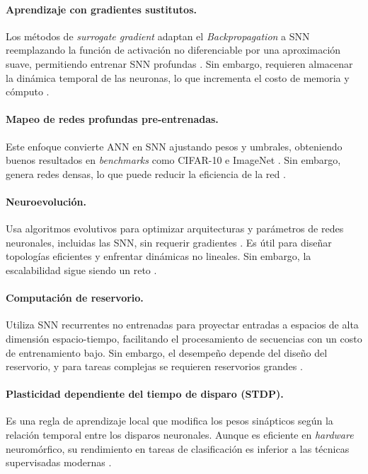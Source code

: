 \paragraph{Aprendizaje con gradientes sustitutos.} Los métodos de \textit{surrogate gradient} adaptan el \textit{Backpropagation} a SNN reemplazando la función de activación no diferenciable por una aproximación suave, permitiendo entrenar SNN profundas \cite{Schuman2022Opportunities}. Sin embargo, requieren almacenar la dinámica temporal de las neuronas, lo que incrementa el costo de memoria y cómputo \cite{Neftci2019SurrogateGradient}.

\paragraph{Mapeo de redes profundas pre-entrenadas.} Este enfoque convierte ANN en SNN ajustando pesos y umbrales, obteniendo buenos resultados en \textit{benchmarks} como CIFAR-10 e ImageNet \cite{deng2021optimal}. Sin embargo, genera redes densas, lo que puede reducir la eficiencia de la red \cite{deng2021optimal}.

\paragraph{Neuroevolución.} Usa algoritmos evolutivos para optimizar arquitecturas y parámetros de redes neuronales, incluidas las SNN, sin requerir gradientes \cite{risi2025neuroevolution}. Es útil para diseñar topologías eficientes y enfrentar dinámicas no lineales. Sin embargo, la escalabilidad sigue siendo un reto \cite{Yue2025CNEA, Shen2024EvolutionarySNN}.

\paragraph{Computación de reservorio.} Utiliza SNN recurrentes no entrenadas para proyectar entradas a espacios de alta dimensión espacio-tiempo, facilitando el procesamiento de secuencias con un costo de entrenamiento bajo. Sin embargo, el desempeño depende del diseño del reservorio, y para tareas complejas se requieren reservorios grandes \cite{Duran2025CMOSSNNReservoir,Polydoros2015ReservoirComputing}.

\paragraph{Plasticidad dependiente del tiempo de disparo (STDP).} Es una regla de aprendizaje local que modifica los pesos sinápticos según la relación temporal entre los disparos neuronales. Aunque es eficiente en \textit{hardware} neuromórfico, su rendimiento en tareas de clasificación es inferior a las técnicas supervisadas modernas \cite{Liu2021SSTDP, Schuman2022Opportunities}. 

